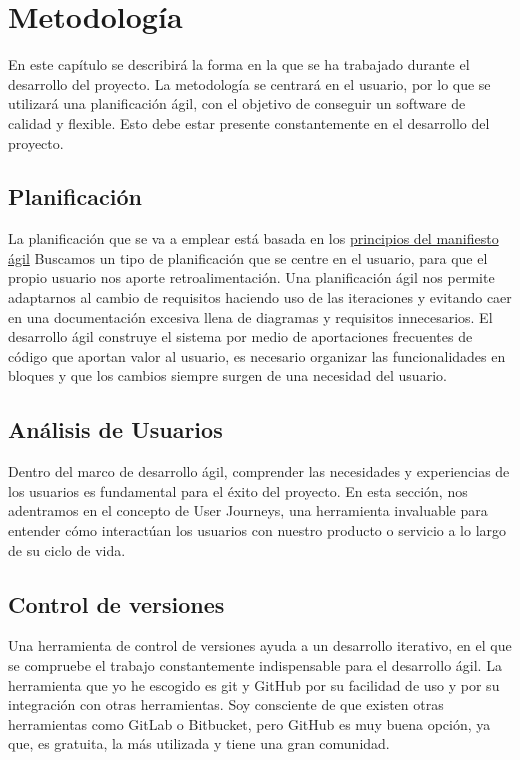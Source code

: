 \UseRawInputEncoding
\chapter{Metodología}
\label{ch:metodología}
En este capítulo se describirá la forma en la que se ha trabajado durante el desarrollo del proyecto.
La metodología se centrará en el usuario, por lo que se utilizará una planificación ágil, con el objetivo
de conseguir un software de calidad y flexible. Esto debe estar presente constantemente en el desarrollo del proyecto.

\section{Planificación}
\label{sc:planificación}
La planificación que se va a emplear está basada en los {\href{https://agilemanifesto.org/iso/es/principles.html}{principios del manifiesto ágil}}
Buscamos un tipo de planificación que se centre en el usuario, para que el propio usuario nos aporte retroalimentación.
Una planificación ágil nos permite adaptarnos al cambio de requisitos haciendo uso de las iteraciones y
evitando caer en una documentación excesiva llena de diagramas y requisitos innecesarios.
El desarrollo ágil construye el sistema por medio de aportaciones frecuentes de código que aportan valor
al usuario, es necesario organizar las funcionalidades en bloques y que los cambios siempre surgen de una
necesidad del usuario.

\section{Análisis de Usuarios}
Dentro del marco de desarrollo ágil, comprender las necesidades y experiencias de los usuarios es fundamental para el éxito del proyecto.
En esta sección, nos adentramos en el concepto de User Journeys, una herramienta invaluable para entender cómo interactúan los usuarios con nuestro producto o servicio a lo largo de su ciclo de vida.



\section{Control de versiones}
Una herramienta de control de versiones ayuda a un desarrollo iterativo, en el que se compruebe el trabajo constantemente indispensable para el desarrollo ágil.
La herramienta que yo he escogido es git y GitHub por su facilidad de uso y por su integración con otras herramientas.
Soy consciente de que existen otras herramientas como GitLab o Bitbucket, pero GitHub es muy buena opción, ya que, es gratuita, la más utilizada y tiene una gran comunidad.


